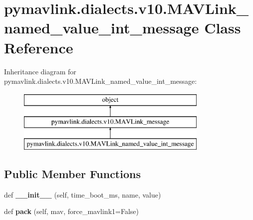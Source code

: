 \hypertarget{classpymavlink_1_1dialects_1_1v10_1_1MAVLink__named__value__int__message}{}\section{pymavlink.\+dialects.\+v10.\+M\+A\+V\+Link\+\_\+named\+\_\+value\+\_\+int\+\_\+message Class Reference}
\label{classpymavlink_1_1dialects_1_1v10_1_1MAVLink__named__value__int__message}
Inheritance diagram for pymavlink.\+dialects.\+v10.\+M\+A\+V\+Link\+\_\+named\+\_\+value\+\_\+int\+\_\+message\+:\begin{figure}[H]
\begin{center}
\leavevmode
\includegraphics[height=3.000000cm]{classpymavlink_1_1dialects_1_1v10_1_1MAVLink__named__value__int__message}
\end{center}
\end{figure}
\subsection*{Public Member Functions}
\begin{DoxyCompactItemize}
\item 
\mbox{\label{classpymavlink_1_1dialects_1_1v10_1_1MAVLink__named__value__int__message_a34fa98fb2f2c0d1ffb529b634e1ab04c}} 
def {\bfseries \+\_\+\+\_\+init\+\_\+\+\_\+} (self, time\+\_\+boot\+\_\+ms, name, value)
\item 
\mbox{\label{classpymavlink_1_1dialects_1_1v10_1_1MAVLink__named__value__int__message_a32f72401e22b8d6c74f1588d8937738e}} 
def {\bfseries pack} (self, mav, force\+\_\+mavlink1=False)
\end{DoxyCompactItemize}

